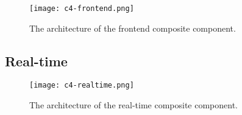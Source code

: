 \documentclass[../thesis.tex]{subfiles}
\begin{document}
\begin{figure}[!ht]
	\centering
	\texttt{[image: c4-frontend.png]}
	\caption{The architecture of the frontend composite component.}
	\label{fig:frontend}
\end{figure}


\subsection{Real-time}
\label{sec:realtime}

\begin{figure}[!ht]
	\centering
	\texttt{[image: c4-realtime.png]}
	\caption{The architecture of the real-time composite component.}
	\label{fig:realtime}
\end{figure}
\end{document}
